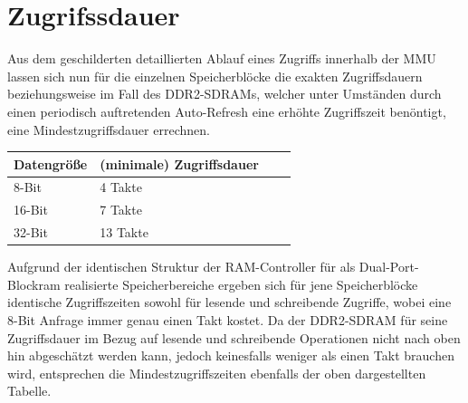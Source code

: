 \section{Zugrifssdauer}

Aus dem geschilderten detaillierten Ablauf eines Zugriffs innerhalb der MMU lassen sich nun f\"ur die einzelnen Speicherbl\"ocke die exakten Zugriffsdauern beziehungsweise im Fall des DDR2-SDRAMs, welcher unter Umst\"anden durch einen periodisch auftretenden Auto-Refresh eine erh\"ohte Zugriffszeit ben\"ontigt, eine Mindestzugriffsdauer errechnen.

\begin{center}
	\begin{tabular}{| l | l | l | l |}
		\hline
		Datengr\"o\ss{}e & (minimale) Zugriffsdauer \\ \hline
		8-Bit & 4 Takte \\ \hline 
		16-Bit & 7 Takte \\ \hline
		32-Bit & 13 Takte \\ \hline
	\end{tabular}
\end{center}

Aufgrund der identischen Struktur der RAM-Controller f\"ur als Dual-Port-Blockram realisierte Speicherbereiche ergeben sich f\"ur jene Speicherbl\"ocke identische Zugriffszeiten sowohl f\"ur lesende und schreibende Zugriffe, wobei eine 8-Bit Anfrage immer genau einen Takt kostet. Da der DDR2-SDRAM f\"ur seine Zugriffsdauer im Bezug auf lesende und schreibende Operationen nicht nach oben hin abgesch\"atzt werden kann, jedoch keinesfalls weniger als einen Takt brauchen wird, entsprechen die Mindestzugriffszeiten ebenfalls der oben dargestellten Tabelle.


